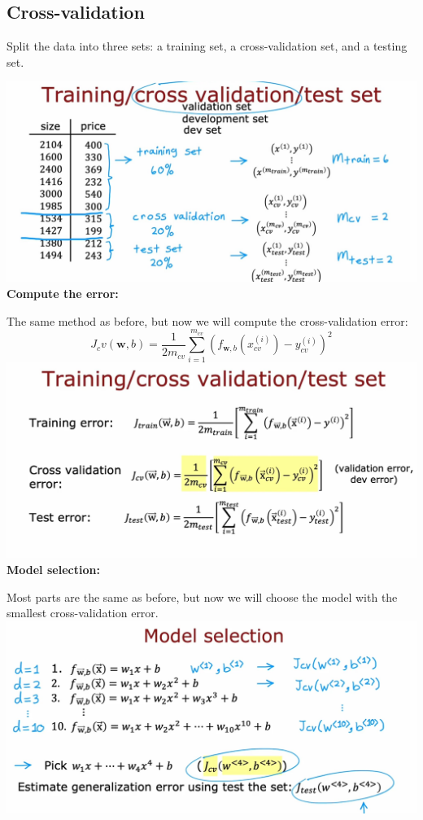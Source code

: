 \subsection*{Cross-validation}
Split the data into three sets: a training set, a cross-validation set, and a testing set.\par
\vspace{2em}
\includegraphics*[width=\textwidth]{images/10.3}
\textbf{Compute the error:}\par
The same method as before, but now we will compute the cross-validation error:
\[J_cv(\mathbf{w}, b) = \frac{1}{2m_{cv}} \sum_{i=1}^{m_{cv}} \left(f_{\mathbf{w}, b}(x_{cv}^{(i)}) - y_{cv}^{(i)}\right)^2\]
\includegraphics*[width=\textwidth]{images/10.4}
\newpage
\noindent
{\large \textbf{Model selection:}}\par
Most parts are the same as before, but now we will choose the model with the smallest cross-validation error.\\
\includegraphics*[width=\textwidth]{images/10.5}
